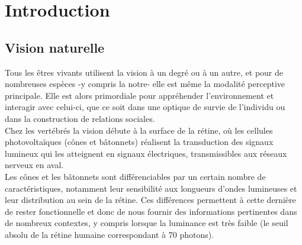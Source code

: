 
\chapter{Introduction} %
\label{Introduction} %


\newcommand{\keyword}[1]{\textbf{#1}}
\newcommand{\tabhead}[1]{\textbf{#1}}
\newcommand{\code}[1]{\texttt{#1}}
\newcommand{\file}[1]{\texttt{\bfseries#1}}
\newcommand{\option}[1]{\texttt{\itshape#1}}


\section{Vision naturelle}
Tous  les êtres vivants utilisent la vision à un degré ou à un autre, et pour de nombreuses espèces -y compris la notre- elle est même la modalité perceptive principale. Elle est alors primordiale pour appréhender l'environnement et interagir avec celui-ci, que ce soit dans une optique de survie de l'individu ou dans la construction de relations sociales.\autocite{Werner2014}\\

Chez les vertébrés la vision débute à la surface de la rétine, où les cellules photovoltaïques (cônes et bâtonnets) réalisent la transduction des signaux lumineux qui les atteignent en signaux électriques, transmissibles aux réseaux nerveux en aval.\autocite{Werner2014}\\
Les cônes et les bâtonnets sont différenciables par un certain nombre de caractéristiques, notamment leur sensibilité aux longueurs d'ondes lumineuses et leur distribution au sein de la rétine. Ces différences permettent à cette dernière de rester fonctionnelle et donc de nous fournir des informations pertinentes dans de nombreux contextes, y compris lorsque la luminance est très faible (le seuil absolu de la rétine humaine correspondant à 70 photons).\autocite{Werner2014}\\


